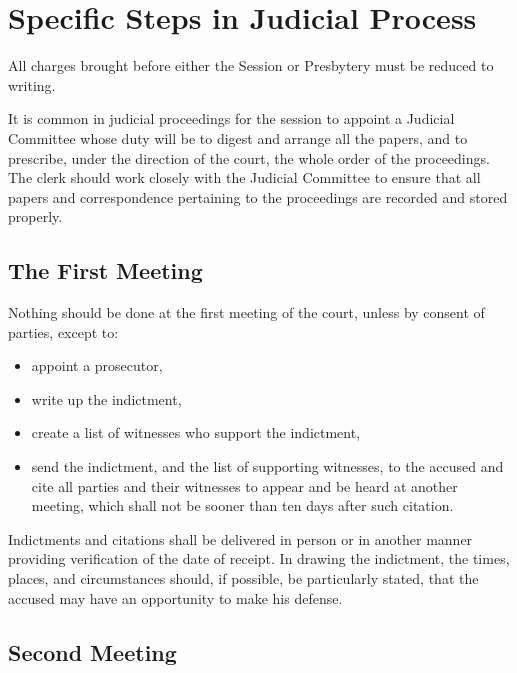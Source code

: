 \documentclass[
]{book}
\providecommand{\tightlist}{%
  \setlength{\itemsep}{0pt}\setlength{\parskip}{0pt}}
\begin{document}
\hypertarget{specific-steps-in-judicial-process}{%
\section{Specific Steps in Judicial Process}\label{specific-steps-in-judicial-process}}

All charges brought before either the Session or Presbytery must be reduced to writing.

It is common in judicial proceedings for the session to appoint a Judicial Committee whose duty will be to digest and arrange all the papers, and to prescribe, under the direction of the court, the whole order of the proceedings. The clerk should work closely with the Judicial Committee to ensure that all papers and correspondence pertaining to the proceedings are recorded and stored properly.

\hypertarget{the-first-meeting}{%
\subsection{The First Meeting}\label{the-first-meeting}}

Nothing should be done at the first meeting of the court, unless by consent of parties, except to:

\begin{itemize}
\tightlist
\item
  appoint a prosecutor,
\item
  write up the indictment,
\item
  create a list of witnesses who support the indictment,
\item
  send the indictment, and the list of supporting witnesses, to the accused and cite all parties and their witnesses to appear and be heard at another meeting, which shall not be sooner than ten days after such citation.
\end{itemize}

Indictments and citations shall be delivered in person or in another manner providing verification of the date of receipt. In drawing the indictment, the times, places, and circumstances should, if possible, be particularly stated, that the accused may have an opportunity to make his defense.

\hypertarget{second-meeting}{%
\subsection{Second Meeting}\label{second-meeting}}
\end{document}
